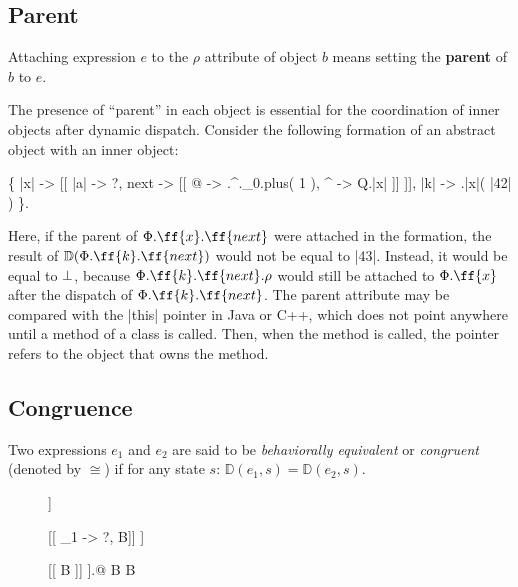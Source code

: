 \subsection{Parent}

\begin{definition}[Parent]
Attaching expression \(e\) to the \(\rho\) attribute of object \(b\)
means setting the \textbf{parent} of \(b\) to \(e\).
\end{definition}

The presence of ``parent'' in each object is essential for the coordination of inner
objects after dynamic dispatch. Consider the following formation of an abstract object
with an inner object:
\begin{phiquation*}
\Big\{ |x| -> [[ |a| -> ?, next -> [[ @ -> \xi.^.\alpha_0.plus( 1 ), ^ -> Q.|x| ]] ]], |k| -> \xi.|x|( |42| ) \Big\}.
\end{phiquation*}
Here, if the parent of \(\Phi.\ff{x}.\ff{next}\) were attached in the formation, the result of \(\mathbb{D}(\Phi.\ff{k}.\ff{next})\)
would not be equal to |43|. Instead, it would be equal to \(\bot\), because \(\Phi.\ff{k}.\ff{next}.\rho\)
would still be attached to \(\Phi.\ff{x}\) after the dispatch of \(\Phi.\ff{k}.\ff{next}\).
The parent attribute may be compared with the |this| pointer in Java or C++, which
does not point anywhere until a method of a class is called. Then, when the method
is called, the  pointer refers to the object that owns the method.

\subsection{Congruence}

\begin{definition}[Congruence]
Two expressions \(e_1\) and \(e_2\) are said to be \emph{behaviorally equivalent}
or \emph{congruent} (denoted by \(\cong\)) if for any state \(s\): \(\mathbb{D}(e_1, s) = \mathbb{D}(e_2, s)\).
\end{definition}

\begin{figure*}
\begin{mdframed}
\begin{phiquation*}
\nf \cong [[ @ -> \nf ]] \quad {}

[[ \tau_1 -> ?, B]] \cong [[ B ]] \quad {}

[[ B ]] \cong [[ B ]].@ \quad{}\;  \in B \;\; \stx{\Delta} \not\in B \quad {}
\end{phiquation*}
\end{mdframed}
\label{fig:congruence}
\end{figure*}

